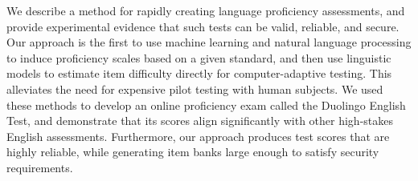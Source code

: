We describe a method for rapidly creating language proficiency assessments, and provide experimental evidence that such tests can be valid, reliable, and secure. Our approach is the first to use machine learning and natural language processing to induce proficiency scales based on a given standard, and then use linguistic models to estimate item difficulty directly for computer-adaptive testing. This alleviates the need for expensive pilot testing with human subjects. We used these methods to develop an online proficiency exam called the Duolingo English Test, and demonstrate that its scores align significantly with other high-stakes English assessments. Furthermore, our approach produces test scores that are highly reliable, while generating item banks large enough to satisfy security requirements.